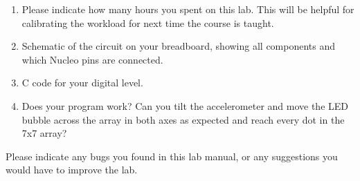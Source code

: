 \documentclass{../../e85}
\date{2018 April 8 (Monday)}
\author{}
\begin{document}
\begin{enumerate}
\item Please indicate how many hours you spent on this lab.  This will
  be helpful for calibrating the workload for next time the course is
  taught.

  \begin{solution}

  \end{solution}

\item Schematic of the circuit on your breadboard, showing all
  components and which Nucleo pins are connected.

  \begin{solution}

  \end{solution}

\item C code for your digital level.

  \begin{solution}

  \end{solution}

\item Does your program work?  Can you tilt the accelerometer and move
  the LED bubble across the array in both axes as expected and reach
  every dot in the 7x7 array?

  \begin{solution}

  \end{solution}
\end{enumerate}

Please indicate any bugs you found in this lab manual, or any
suggestions you would have to improve the lab.
\end{document}
